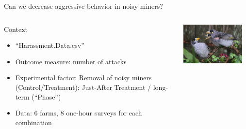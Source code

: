 \documentclass[10pt]{beamer}
\begin{document}
\begin{frame}{Can we decrease aggressive behavior in noisy miners?}
\begin{columns}
 \begin{column}{0.6\textwidth}
 \begin{block}{Context}
  \begin{itemize}
    \item ``Harassment.Data.csv''
    \item Outcome measure: number of attacks\\
    \item Experimental factor: Removal of noisy miners (Control/Treatment); Just-After Treatment / long-term (``Phase'')\\
    \item Data: 6 farms, 8 one-hour surveys for each combination
    \end{itemize}
   \end{block}
  \end{column}
  \begin{column}{0.4\textwidth}
   \includegraphics[width=0.9\textwidth]{Figures/noisyminer}
  \end{column}

\end{columns}

 
\end{frame}
\end{document}
